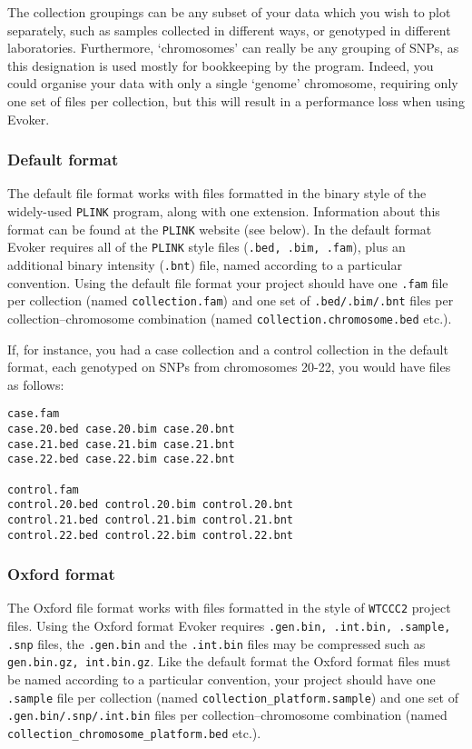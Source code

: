 \documentclass{article}
\begin{document}
The collection groupings can be any subset of your data which you wish to plot separately, such as samples collected in different ways, or genotyped in different laboratories. Furthermore, `chromosomes' can really be any grouping of SNPs, as this designation is used mostly for bookkeeping by the program. Indeed, you could organise your data with only a single `genome' chromosome, requiring only one set of files per collection, but this will result in a performance loss when using Evoker.

\subsubsection{Default format}
The default file format works with files formatted in the binary style of the widely-used \texttt{PLINK} program, along with one extension. Information about this format can be found at the \texttt{PLINK} website (see below). In the default format Evoker requires all of the \texttt{PLINK} style files (\texttt{.bed, .bim, .fam}), plus an additional binary intensity (\texttt{.bnt}) file, named according to a particular convention. Using the default file format your project should have one \texttt{.fam} file per collection (named \texttt{collection.fam}) and one set of \texttt{.bed/.bim/.bnt} files per collection--chromosome combination (named \texttt{collection.chromosome.bed} etc.).

If, for instance, you had a case collection and a control collection in the default format, each genotyped on SNPs from chromosomes 20-22, you would have files as follows:

\begin{verbatim}
case.fam
case.20.bed case.20.bim case.20.bnt 
case.21.bed case.21.bim case.21.bnt 
case.22.bed case.22.bim case.22.bnt 

control.fam
control.20.bed control.20.bim control.20.bnt
control.21.bed control.21.bim control.21.bnt
control.22.bed control.22.bim control.22.bnt
\end{verbatim}

\subsubsection{Oxford format}
The Oxford file format works with files formatted in the style of \texttt{WTCCC2} project files. Using the Oxford format Evoker requires \texttt{.gen.bin, .int.bin, .sample, .snp} files, the \texttt{.gen.bin} and the \texttt{.int.bin} files may be compressed such as \texttt{gen.bin.gz, int.bin.gz}. Like the default format the Oxford format files must be named according to a particular convention, your project should have one \texttt{.sample} file per collection (named \texttt{collection\_platform.sample}) and one set of \texttt{.gen.bin/.snp/.int.bin} files per collection--chromosome combination (named \texttt{collection\_chromosome\_platform.bed} etc.).
\end{document}
